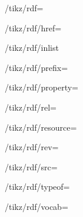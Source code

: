 \begin{key}{/tikz/rdf=}
  \begin{key}{/tikz/rdf/href=}
  \end{key}

  \begin{key}{/tikz/rdf/inlist}
  \end{key}

  \begin{key}{/tikz/rdf/prefix=}
  \end{key}

  \begin{key}{/tikz/rdf/property=}
  \end{key}

  \begin{key}{/tikz/rdf/rel=}
  \end{key}

  \begin{key}{/tikz/rdf/resource=}
  \end{key}

  \begin{key}{/tikz/rdf/rev=}
  \end{key}

  \begin{key}{/tikz/rdf/src=}
  \end{key}

  \begin{key}{/tikz/rdf/typeof=}
  \end{key}

  \begin{key}{/tikz/rdf/vocab=}
  \end{key}
\end{key}

